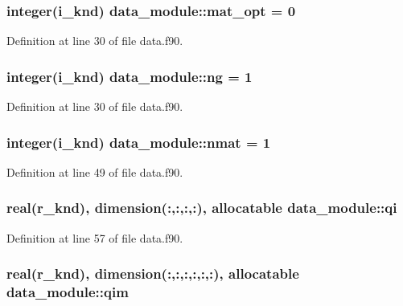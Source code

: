 \hypertarget{classdata__module_a191b122ec7d6da5c691c45d89d65694f}{
\subsubsection[{mat\-\_\-opt}]{\setlength{\rightskip}{0pt plus 5cm}integer(i\-\_\-knd) data\-\_\-module\-::mat\-\_\-opt = 0}}\label{classdata__module_a191b122ec7d6da5c691c45d89d65694f}


Definition at line 30 of file data.\-f90.

\hypertarget{classdata__module_a6ea7c9f76a6293c4f8b39b1782564561}{
\subsubsection[{ng}]{\setlength{\rightskip}{0pt plus 5cm}integer(i\-\_\-knd) data\-\_\-module\-::ng = 1}}\label{classdata__module_a6ea7c9f76a6293c4f8b39b1782564561}


Definition at line 30 of file data.\-f90.

\hypertarget{classdata__module_ad6de7dfbc5089cdc8cdfe59d6232f7d2}{
\subsubsection[{nmat}]{\setlength{\rightskip}{0pt plus 5cm}integer(i\-\_\-knd) data\-\_\-module\-::nmat = 1}}\label{classdata__module_ad6de7dfbc5089cdc8cdfe59d6232f7d2}


Definition at line 49 of file data.\-f90.

\hypertarget{classdata__module_a6d90b19307bcaef3132e6854534ba68f}{
\subsubsection[{qi}]{\setlength{\rightskip}{0pt plus 5cm}real(r\-\_\-knd), dimension(\-:,\-:,\-:,\-:), allocatable data\-\_\-module\-::qi}}\label{classdata__module_a6d90b19307bcaef3132e6854534ba68f}


Definition at line 57 of file data.\-f90.

\hypertarget{classdata__module_ab410d844881c0109e63b2e26e3dbbd37}{
\subsubsection[{qim}]{\setlength{\rightskip}{0pt plus 5cm}real(r\-\_\-knd), dimension(\-:,\-:,\-:,\-:,\-:,\-:), allocatable data\-\_\-module\-::qim}}\label{classdata__module_ab410d844881c0109e63b2e26e3dbbd37}



